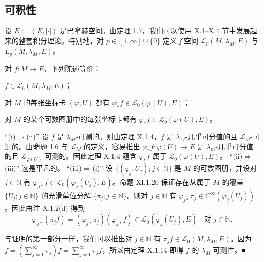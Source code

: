 \subsection*{可积性}

设 $ E := (E, |\cdot|) $ 是巴拿赫空间。由定理 1.7，我们可以使用 X.1–X.4 节中发展起来的整套积分理论。特别地，对 $ p \in [1, \infty] \cup \{0\} $ 定义了空间 $ \mathcal{L}_p(M, \lambda_M, E) $ 与 $ L_p(M, \lambda_M, E) $。

\begin{proposition}

对 $ f: M \to E $，下列陈述等价：

\begin{subitems}
\item

$ f \in \mathcal{L}_0(M, \lambda_M, E) $；

\item

对 $ M $ 的每张坐标卡 $ (\varphi, U) $ 都有 $ \varphi_* f \in \mathcal{L}_0(\varphi(U), E) $；

\item

对 $ M $ 的某个可数图册中的每张坐标卡都有 $ \varphi_* f \in \mathcal{L}_0(\varphi(U), E) $。

\proofhead
“(i)$ \Rightarrow $(ii)” 设 $ f $ 是 $ \lambda_M $-可测的。则由定理 X.1.4，$ f $ 是 $ \lambda_M $-几乎可分值的且 $ \mathcal{L}_M $-可测的。由命题 1.6 与 $ \mathcal{L}_M $ 的定义，容易推出 $ \varphi_* f: \varphi(U) \to E $ 是 $ \lambda_m $-几乎可分值的且 $ \mathcal{L}_{\varphi(U)} $-可测的。因此定理 X.1.4 蕴含 $ \varphi_* f $ 属于 $ \mathcal{L}_0(\varphi(U), E) $。
“(ii)$ \Rightarrow $(iii)” 这是平凡的。
“(iii)$ \Rightarrow $(i)” 设 $ \{(\varphi_j, U_j) ; j \in \mathbb{N}\} $ 是 $ M $ 的可数图册，并设对 $ j \in \mathbb{N} $ 有 $ \varphi_{j*} f \in \mathcal{L}_0(\varphi_j(U_j), E) $。命题 XI.1.20 保证存在从属于 $ M $ 的覆盖 $ \{U_j ; j \in \mathbb{N}\} $ 的光滑单位分解 $ \{\pi_j ; j \in \mathbb{N}\} $。则对 $ j \in \mathbb{N} $ 有 $ \varphi_{j*}\pi_j \in C^\infty(\varphi_j(U_j)) $。因此由注 X.1.2(d) 得到
\[
\varphi_{j*}(\pi_j f) = (\varphi_{j*}\pi_j)(\varphi_{j*} f) \in \mathcal{L}_0(\varphi_j(U_j), E) \quad \text{对 } j \in \mathbb{N} .
\]

与证明的第一部分一样，我们可以推出对 $ j \in \mathbb{N} $ 有 $ \pi_j f \in \mathcal{L}_0(M, \lambda_M, E) $。因为 $ f = (\sum_{j=1}^{\infty}\pi_j)f = \sum_{j=1}^{\infty}\pi_j f $，所以由定理 X.1.14 即得 $ f $ 的 $ \lambda_M $-可测性。\nobreak\hspace{0.35em}■

\end{subitems}

\end{proposition}

